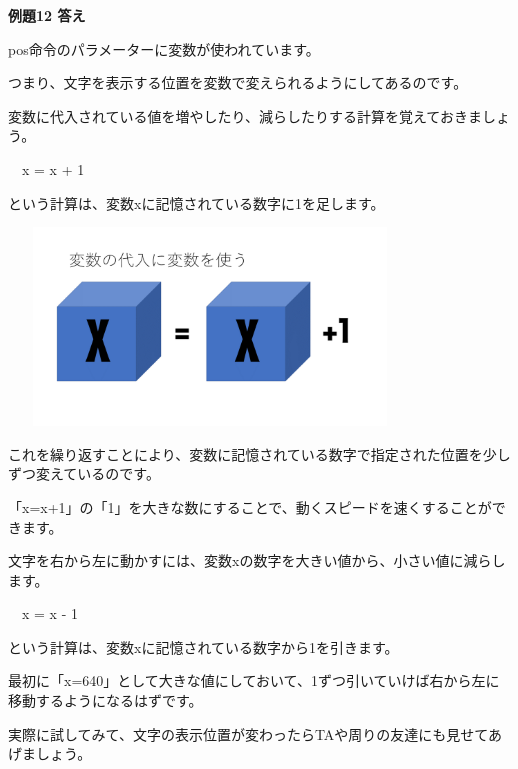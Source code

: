 \documentclass[a4paper,12pt]{jarticle}
\begin{document}
\bigskip

\bigskip

{\bfseries
例題12 答え}

\bigskip

pos命令のパラメーターに変数が使われています。

つまり、文字を表示する位置を変数で変えられるようにしてあるのです。

変数に代入されている値を増やしたり、減らしたりする計算を覚えておきましょう。


\bigskip

\ \ x = x + 1

\bigskip

という計算は、変数xに記憶されている数字に1を足します。

\bigskip
\bigskip

\begin{minipage}{9.781cm}
\centering
{\upshape
\includegraphics[keepaspectratio,width=10.689cm,height=5.265cm]{text02-img/text02-img051.png}}
\end{minipage}

\bigskip
\bigskip
\bigskip

これを繰り返すことにより、変数に記憶されている数字で指定された位置を少しずつ変えているのです。

「x=x+1」の「1」を大きな数にすることで、動くスピードを速くすることができます。

文字を右から左に動かすには、変数xの数字を大きい値から、小さい値に減らします。

\bigskip

\ \ x = x - 1

\bigskip

という計算は、変数xに記憶されている数字から1を引きます。

最初に「x=640」として大きな値にしておいて、1ずつ引いていけば右から左に移動するようになるはずです。

実際に試してみて、文字の表示位置が変わったらTAや周りの友達にも見せてあげましょう。
\end{document}

